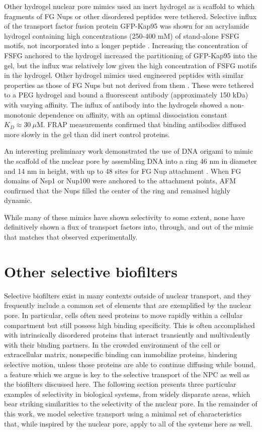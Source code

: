 Other hydrogel nuclear pore mimics used an inert hydrogel as a scaffold to which fragments of FG Nups or other disordered peptides were tethered.  Selective influx of the transport factor fusion protein GFP-Kap95 was shown for an acrylamide hydrogel containing high concentrations (250-400 mM) of stand-alone FSFG motifs, not incorporated into a longer peptide \cite{friedman16a}.  Increasing the concentration of FSFG anchored to the hydrogel increased the partitioning of GFP-Kap95 into the gel, but the influx was relatively low given the high concentration of FSFG motifs in the hydrogel.  Other hydrogel mimics used engineered peptides with similar properties as those of FG Nups but not derived from them \cite{yang18}.  These were tethered to a PEG hydrogel and bound a fluorescent antibody (approximately 150 kDa) with varying affinity.  The influx of antibody into the hydrogels showed a non-monotonic dependence on affinity, with an optimal dissociation constant $K_D \approx 30~\mu$M.  FRAP measurements confirmed that binding antibodies diffused more slowly in the gel than did inert control proteins.

An interesting preliminary work demonstrated the use of DNA origami to mimic the scaffold of the nuclear pore by assembling DNA into a ring 46 nm in diameter and 14 nm in height, with up to 48 sites for FG Nup attachment \cite{fisher18}.  When FG domains of Nsp1 or Nup100 were anchored to the attachment points, AFM confirmed that the Nups filled the center of the ring and remained highly dynamic.

 While many of these mimics have shown selectivity to some extent, none have definitively shown a flux of transport factors into, through, and out of the mimic that matches that observed experimentally.  

\section{Other selective biofilters}
\label{sec:other-systems}

Selective biofilters exist in many contexts outside of nuclear transport, and they frequently include a common set of elements that are exemplified by the nuclear pore.  In particular, cells often need proteins to move rapidly within a cellular compartment but still possess high binding specificity.  This is often accomplished with intrinsically disordered proteins that interact transiently and multivalently with their binding partners.  In the crowded environment of the cell or extracellular matrix, nonspecific binding can immobilize proteins, hindering selective motion, unless those proteins are able to continue diffusing while bound, a feature which we argue is key to the selective transport of the NPC as well as the biofilters discussed here. The following section presents three particular examples of selectivity in biological systems, from widely disparate areas, which bear striking similarities to the selectivity of the nuclear pore.  In the remainder of this work, we model selective transport using a minimal set of characteristics that, while inspired by the nuclear pore, apply to all of the systems here as well.

